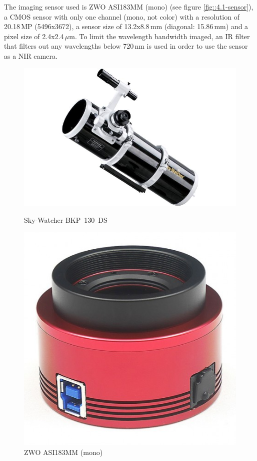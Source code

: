 The imaging sensor used is ZWO ASI183MM (mono) (see figure \ref{fig::4.1-sensor}), a CMOS sensor with only one channel (mono, not color) with a resolution of 20.18\,MP (5496x3672), a sensor size of 13.2x8.8\,mm (diagonal: 15.86\,mm) and a pixel size of 2.4x2.4\,$\mu$m. To limit the wavelength bandwidth imaged, an IR filter that filters out any wavelengths below 720\,nm is used in order to use the sensor as a NIR camera.

\begin{figure}[h]
	\centering
	\begin{minipage}[t]{0.4\linewidth}
		\centering
		\includegraphics[width=0.8\linewidth]{4-experiment-design/img/setup/SkyWatcher_BKP130DS}
		\caption{Sky-Watcher BKP~130~DS} %
		\label{fig::4.1-telescope}
	\end{minipage}
	\hspace{0.1\linewidth}
	\begin{minipage}[t]{0.4\linewidth}
		\centering
		\includegraphics[width=0.5\linewidth]{4-experiment-design/img/setup/ZWO_ASI183MM}
		\caption{ZWO ASI183MM (mono) \cite{CMOS_sensor} }
		\label{fig:4.1-sensor}
	\end{minipage}

\end{figure}

